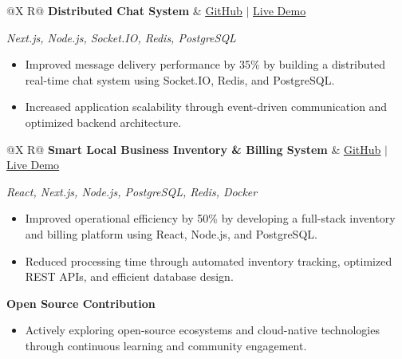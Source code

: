 \documentclass[a4paper,10pt]{article}
\newcommand{\ulink}[2]{\href{#1}{\uline{#2}}}
\newcommand{\subheading}[1]{{\color[HTML]{0A0A0A}\fontsize{12}{14}\selectfont\bfseries #1}}
\newcommand{\techstack}[1]{{\color[HTML]{5C5C5C}\fontsize{10.5}{12.5}\selectfont\itshape #1}}
\newcommand{\meta}[1]{{\color[HTML]{5C5C5C}\fontsize{10.5}{12.5}\selectfont #1}}
\begin{document}
\vspace{6pt}

\begin{tabularx}{\linewidth}{@{}X R@{}}
  \subheading{Distributed Chat System} &
  \meta{\ulink{https://github.com/su-jin1425/distributed-chat-system}{GitHub} $|$ \ulink{https://distributed-chat-system.vercel.app}{Live Demo}}
\end{tabularx}
\vspace{1pt}
\techstack{Next.js, Node.js, Socket.IO, Redis, PostgreSQL}
\begin{itemize}[nosep, leftmargin=1.5em, itemsep=2pt, topsep=3pt]
  \item {\color[HTML]{0A0A0A}\fontsize{11}{15}\selectfont Improved message delivery performance by 35\% by building a distributed real-time chat system using Socket.IO, Redis, and PostgreSQL.}
  \item {\color[HTML]{0A0A0A}\fontsize{11}{15}\selectfont Increased application scalability through event-driven communication and optimized backend architecture.}
\end{itemize}

\vspace{6pt}

\begin{tabularx}{\linewidth}{@{}X R@{}}
  \subheading{Smart Local Business Inventory \& Billing System} &
  \meta{\ulink{https://github.com/su-jin1425/smart-local-business-inventory}{GitHub} $|$ \ulink{https://smart-local-business-inventory.vercel.app}{Live Demo}}
\end{tabularx}
\vspace{1pt}
\techstack{React, Next.js, Node.js, PostgreSQL, Redis, Docker}
\begin{itemize}[nosep, leftmargin=1.5em, itemsep=2pt, topsep=3pt]
  \item {\color[HTML]{0A0A0A}\fontsize{11}{15}\selectfont Improved operational efficiency by 50\% by developing a full-stack inventory and billing platform using React, Node.js, and PostgreSQL.}
  \item {\color[HTML]{0A0A0A}\fontsize{11}{15}\selectfont Reduced processing time through automated inventory tracking, optimized REST APIs, and efficient database design.}
\end{itemize}

\vspace{6pt}

\subheading{Open Source Contribution}
\begin{itemize}[nosep, leftmargin=1.5em, itemsep=2pt, topsep=3pt]
  \item {\color[HTML]{0A0A0A}\fontsize{11}{15}\selectfont Actively exploring open-source ecosystems and cloud-native technologies through continuous learning and community engagement.}
\end{itemize}
\end{document}
